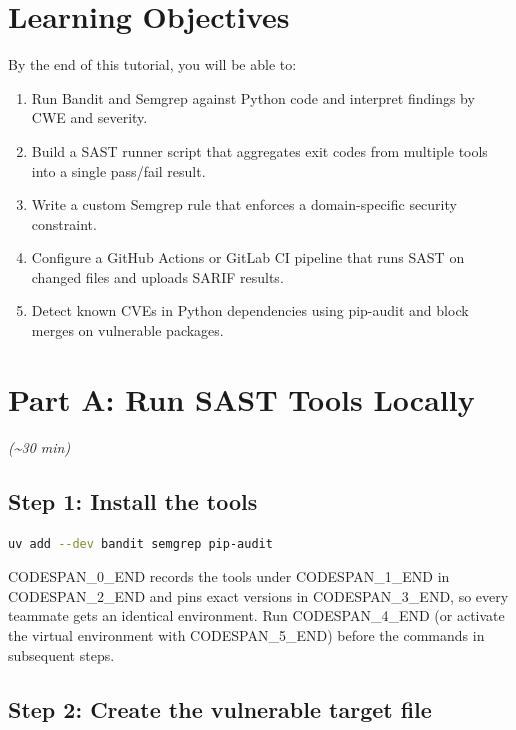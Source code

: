 \documentclass[11pt,a4paper]{book}
\begin{document}
\medskip

\section{Learning Objectives}

By the end of this tutorial, you will be able to:

\begin{enumerate}
  \item Run Bandit and Semgrep against Python code and interpret findings by CWE and severity.
  \item Build a SAST runner script that aggregates exit codes from multiple tools into a single pass/fail result.
  \item Write a custom Semgrep rule that enforces a domain-specific security constraint.
  \item Configure a GitHub Actions or GitLab CI pipeline that runs SAST on changed files and uploads SARIF results.
  \item Detect known CVEs in Python dependencies using pip-audit and block merges on vulnerable packages.
\end{enumerate}

\medskip

\section{Part A: Run SAST Tools Locally}

\textit{(\textasciitilde{}30 min)}

\subsection{Step 1: Install the tools}

\begin{lstlisting}[language=Bash]
uv add --dev bandit semgrep pip-audit
\end{lstlisting}

CODESPAN\_0\_END records the tools under CODESPAN\_1\_END in CODESPAN\_2\_END and pins exact versions in CODESPAN\_3\_END, so every teammate gets an identical environment. Run CODESPAN\_4\_END (or activate the virtual environment with CODESPAN\_5\_END) before the commands in subsequent steps.

\subsection{Step 2: Create the vulnerable target file}
\end{document}
